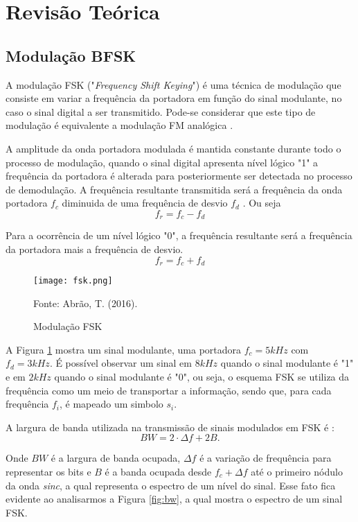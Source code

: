 \newpage
\section{Revisão Teórica}
\subsection{Modulação BFSK}
A modulação FSK ("\emph{Frequency Shift Keying}") é uma técnica de modulação que consiste em variar a frequência da portadora em função do sinal modulante, no caso o sinal digital a ser transmitido.
Pode-se considerar que este tipo de modulação é equivalente a modulação FM analógica \cite{couch}.

A amplitude da onda portadora modulada é mantida constante durante todo o processo de modulação, quando o sinal digital apresenta nível lógico "1" a frequência da portadora é alterada para posteriormente ser detectada no processo de demodulação.
A frequência resultante transmitida será a frequência da onda portadora $f_c$ diminuida de uma frequência de desvio $f_d$ \cite{taufik1}.
Ou seja
\begin{equation}
    f_r = f_c - f_d
\end{equation}

Para a ocorrência de um nível lógico "0", a frequência resultante será a frequência da portadora mais a frequência de desvio.
\begin{equation}
    f_r = f_c + f_d
\end{equation}

\begin{figure}[H]
    \centering
    \caption{Modulação FSK}
    \texttt{[image: fsk.png]}
    \label{fig:mdfsk}
    
    \small Fonte: Abrão, T. (2016).
\end{figure}

A Figura \ref{fig:mdfsk} mostra um sinal modulante, uma portadora $f_c=5kHz$ com $f_d = 3kHz$.
É possível observar um sinal em $8kHz$ quando o sinal modulante é "1" e em $2kHz$ quando o sinal modulante é "0", ou seja, o esquema FSK se utiliza da frequência como um meio de transportar a informação, sendo que, para cada frequência $f_i$, é mapeado um simbolo $s_i$.

A largura de banda utilizada na transmissão de sinais modulados em FSK é \cite{abrao}:
\[
BW = 2\cdot \Delta f +2B.
\]

Onde $BW$ é a largura de banda ocupada, $\Delta f$ é a variação de frequência para representar os bits e $B$ é a banda ocupada desde  $f_c + \Delta f$ até o primeiro nódulo da onda \textit{sinc}, a qual representa o espectro de um nível do sinal. 
Esse fato fica evidente ao analisarmos a Figura \ref{fig:bw}, a qual mostra o espectro de um sinal FSK.

